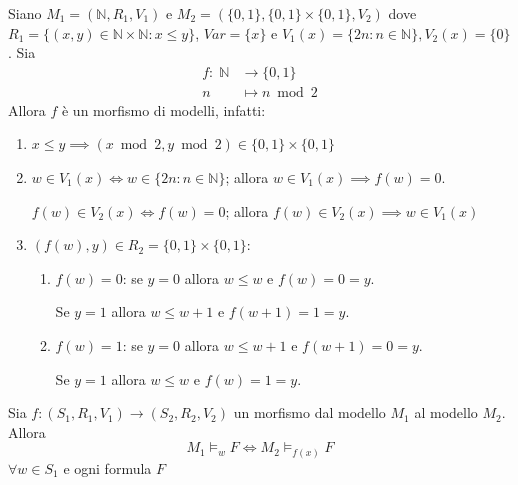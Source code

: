 \documentclass[../main.tex]{subfiles}
\begin{document}
\begin{example}
    Siano $M_1 = (\mathbb{N}, R_1, V_1)$ e $M_2 = (\{0,1\}, \{0,1\} \times \{0,1\}, V_2)$ dove $R_1 = \{(x,y) \in \mathbb{N} \times \mathbb{N} : x \leq y\}$, $Var = \{x\}$ e $V_1(x)= \{2n : n \in \mathbb{N}\}, V_2(x) = \{0\}$. Sia
    \begin{align*}
        f : \; \mathbb{N} & \rightarrow \{0,1\} \\
        n                 & \mapsto n \bmod 2
    \end{align*}
    Allora $f$ è un morfismo di modelli, infatti:
    \begin{enumerate}
        \item $x \leq y \implies (x \bmod 2, y \bmod 2) \in \{0,1\} \times \{0,1\}$
        \item $w \in V_1(x) \iff w \in \{2n: n \in \mathbb{N}\}$; allora $w \in V_1(x) \implies f(w) = 0$.

              $f(w) \in V_2(x) \iff f(w) = 0 $; allora $f(w) \in V_2(x) \implies w \in V_1(x)$
        \item $(f(w),y) \in R_2 = \{0,1\} \times \{0,1\}$:
              \begin{enumerate}
                  \item $f(w) = 0$: se $y=0$ allora $w \leq w$ e $f(w) = 0 = y$.

                        Se $y=1$ allora $w \leq w+1$ e $f(w+1) = 1 = y$.
                  \item $f(w) = 1$: se $y=0$ allora $w \leq w + 1$ e $f(w + 1) = 0 = y$.

                        Se $y=1$ allora $w \leq w$ e $f(w) = 1 = y$.
              \end{enumerate}
    \end{enumerate}
\end{example}
\begin{lemma}[Lemma 1]
    Sia $f: (S_1, R_1, V_1) \rightarrow (S_2, R_2, V_2)$ un morfismo dal modello $M_1$ al modello $M_2$. Allora
    \begin{equation*}
        M_1 \vDash_w F \iff M_2 \vDash_{f(x)} F
    \end{equation*}
    $\forall w \in S_1$ e ogni formula $F$
\end{lemma}
\end{document}
